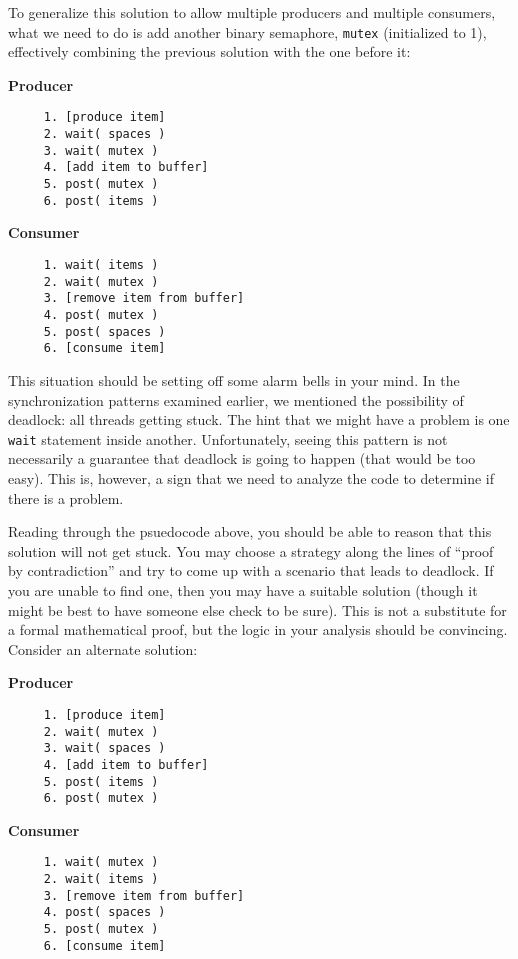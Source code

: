 To generalize this solution to allow multiple producers and multiple consumers, what we need to do is add another binary semaphore, \texttt{mutex} (initialized to 1), effectively combining the previous solution with the one before it:

\begin{multicols}{2}
\textbf{Producer}\vspace{-2em}
  \begin{verbatim}
	 1. [produce item]
	 2. wait( spaces )
	 3. wait( mutex )
	 4. [add item to buffer]
	 5. post( mutex )
	 6. post( items )
  \end{verbatim}
\columnbreak
\textbf{Consumer}\vspace{-2em}
  \begin{verbatim}
	 1. wait( items )
	 2. wait( mutex )
	 3. [remove item from buffer]
	 4. post( mutex )
	 5. post( spaces )
	 6. [consume item]
  \end{verbatim}
\end{multicols}
\vspace{-2em}

This situation should be setting off some alarm bells in your mind. In the synchronization patterns examined earlier, we mentioned the possibility of deadlock: all threads getting stuck. The hint that we might have a problem is one \texttt{wait} statement inside another. Unfortunately, seeing this pattern is not necessarily a guarantee that deadlock is going to happen (that would be too easy). This is, however, a sign that we need to analyze the code to determine if there is a problem. 

Reading through the psuedocode above, you should be able to reason that this solution will not get stuck. You may choose a strategy along the lines of ``proof by contradiction'' and try to come up with a scenario that leads to deadlock. If you are unable to find one, then you may have a suitable solution (though it might be best to have someone else check to be sure). This is not a substitute for a formal mathematical proof, but the logic in your analysis should be convincing. Consider an alternate solution:

\begin{multicols}{2}
\textbf{Producer}\vspace{-2em}
  \begin{verbatim}
	 1. [produce item]
	 2. wait( mutex )
	 3. wait( spaces )
	 4. [add item to buffer]
	 5. post( items )
	 6. post( mutex )
  \end{verbatim}
\columnbreak
\textbf{Consumer}\vspace{-2em}
  \begin{verbatim}
	 1. wait( mutex )
	 2. wait( items )
	 3. [remove item from buffer]
	 4. post( spaces )
	 5. post( mutex )
	 6. [consume item]
  \end{verbatim}
\end{multicols}
\vspace{-2em}

